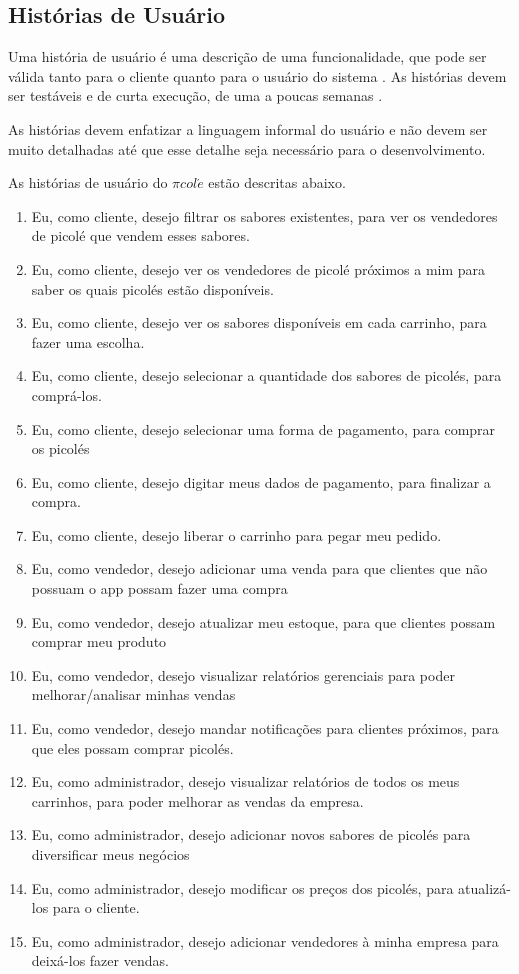 \subsection{Histórias de Usuário}
\label{sec:historias}

Uma história de usuário é uma descrição de uma funcionalidade, que pode ser válida tanto para o cliente quanto para o usuário do sistema \cite{cohn2004user}. As histórias devem ser testáveis e de curta execução, de uma a poucas semanas \cite{breitman}.

As histórias devem enfatizar a linguagem informal do usuário e não devem ser muito detalhadas até que esse detalhe seja necessário para o desenvolvimento. \cite{cohn2004advantages}

As histórias de usuário do $\pi col\acute{e}$ estão descritas abaixo.

\begin{enumerate}
\item Eu, como cliente, desejo filtrar os sabores existentes, para ver os vendedores de picolé que vendem esses sabores.
\item Eu, como cliente, desejo ver os vendedores de picolé próximos a mim para saber os quais picolés estão disponíveis.
\item Eu, como cliente, desejo ver os sabores disponíveis em cada carrinho, para fazer uma escolha.
\item Eu, como cliente, desejo selecionar a quantidade dos sabores de picolés, para comprá-los.
\item Eu, como cliente, desejo selecionar uma forma de pagamento, para comprar os picolés
\item Eu, como cliente, desejo digitar meus dados de pagamento, para finalizar a compra.
\item Eu, como cliente, desejo liberar o carrinho para pegar meu pedido.
\item Eu, como vendedor, desejo adicionar uma venda para que clientes que não possuam o app possam fazer uma compra
\item Eu, como vendedor, desejo atualizar meu estoque, para que clientes possam comprar meu produto
\item Eu, como vendedor, desejo visualizar relatórios gerenciais para poder melhorar/analisar minhas vendas
\item Eu, como vendedor, desejo mandar notificações para clientes próximos, para que eles possam comprar picolés.
\item Eu, como administrador, desejo visualizar relatórios de todos os meus carrinhos, para poder melhorar as vendas da empresa.
\item Eu, como administrador, desejo adicionar novos sabores de picolés para diversificar meus negócios
\item Eu, como administrador, desejo modificar os preços dos picolés, para atualizá-los para o cliente.
\item Eu, como administrador, desejo adicionar vendedores à minha empresa para deixá-los fazer vendas.
\end{enumerate}


